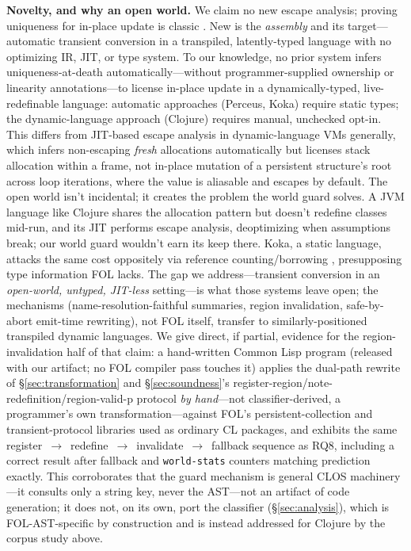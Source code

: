 \documentclass[sigplan,review,anonymous]{acmart}
\begin{document}
\textbf{Novelty, and why an open world.} We claim no new escape analysis; proving uniqueness for in-place update is classic \cite{hudak1985aggregate}. New is the \emph{assembly} and its target---automatic transient conversion in a transpiled, latently-typed language with no optimizing IR, JIT, or type system. To our knowledge, no prior system infers uniqueness-at-death automatically---without programmer-supplied ownership or linearity annotations---to license in-place update in a dynamically-typed, live-redefinable language: automatic approaches (Perceus, Koka) require static types; the dynamic-language approach (Clojure) requires manual, unchecked opt-in. This differs from JIT-based escape analysis in dynamic-language VMs generally, which infers non-escaping \emph{fresh} allocations automatically but licenses stack allocation within a frame, not in-place mutation of a persistent structure's root across loop iterations, where the value is aliasable and escapes by default. The open world isn't incidental; it creates the problem the world guard solves. A JVM language like Clojure shares the allocation pattern but doesn't redefine classes mid-run, and its JIT performs escape analysis, deoptimizing when assumptions break; our world guard wouldn't earn its keep there. Koka, a static language, attacks the same cost oppositely via reference counting/borrowing \cite{reinking2021perceus,lorenzen2023functional}, presupposing type information FOL lacks. The gap we address---transient conversion in an \emph{open-world, untyped, JIT-less} setting---is what those systems leave open; the mechanisms (name-resolution-faithful summaries, region invalidation, safe-by-abort emit-time rewriting), not FOL itself, transfer to similarly-positioned transpiled dynamic languages. We give direct, if partial, evidence for the region-invalidation half of that claim: a hand-written Common Lisp program (released with our artifact; no FOL compiler pass touches it) applies the dual-path rewrite of §\ref{sec:transformation} and §\ref{sec:soundness}'s register-region/note-redefinition/region-valid-p protocol \emph{by hand}---not classifier-derived, a programmer's own transformation---against FOL's persistent-collection and transient-protocol libraries used as ordinary CL packages, and exhibits the same register~$\to$~redefine~$\to$~invalidate~$\to$~fallback sequence as RQ8, including a correct result after fallback and \texttt{world-stats} counters matching prediction exactly. This corroborates that the guard mechanism is general CLOS machinery---it consults only a string key, never the AST---not an artifact of code generation; it does not, on its own, port the classifier (§\ref{sec:analysis}), which is FOL-AST-specific by construction and is instead addressed for Clojure by the corpus study above.
\end{document}
